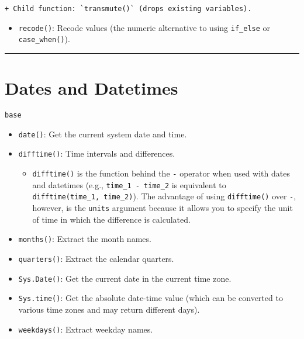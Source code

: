 \documentclass[]{book}
\providecommand{\tightlist}{%
  \setlength{\itemsep}{0pt}\setlength{\parskip}{0pt}}
\begin{document}
\begin{verbatim}
+ Child function: `transmute()` (drops existing variables).
\end{verbatim}

\begin{itemize}
\tightlist
\item
  \texttt{recode()}: Recode values (the numeric alternative to using \texttt{if\_else} or \texttt{case\_when()}).
\end{itemize}

\begin{center}\rule{0.5\linewidth}{\linethickness}\end{center}

\hypertarget{dates-and-datetimes-1}{%
\section{Dates and Datetimes}\label{dates-and-datetimes-1}}

\texttt{base}

\begin{itemize}
\tightlist
\item
  \texttt{date()}: Get the current system date and time.
\item
  \texttt{difftime()}: Time intervals and differences.

  \begin{itemize}
  \tightlist
  \item
    \texttt{difftime()} is the function behind the \texttt{-} operator when used with dates and datetimes (e.g., \texttt{time\_1\ -\ time\_2} is equivalent to \texttt{difftime(time\_1,\ time\_2)}). The advantage of using \texttt{difftime()} over \texttt{-}, however, is the \texttt{units} argument because it allows you to specify the unit of time in which the difference is calculated.
  \end{itemize}
\item
  \texttt{months()}: Extract the month names.
\item
  \texttt{quarters()}: Extract the calendar quarters.
\item
  \texttt{Sys.Date()}: Get the current date in the current time zone.
\item
  \texttt{Sys.time()}: Get the absolute date-time value (which can be converted to various time zones and may return different days).
\item
  \texttt{weekdays()}: Extract weekday names.
\end{itemize}
\end{document}
